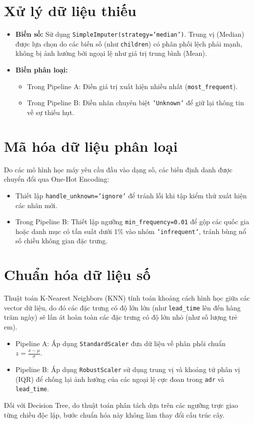 \section{Xử lý dữ liệu thiếu}
\begin{itemize}
    \item \textbf{Biến số:} Sử dụng \texttt{SimpleImputer(strategy='median')}. Trung vị (Median) được lựa chọn do các biến số (như \texttt{children}) có phân phối lệch phải mạnh, không bị ảnh hưởng bởi ngoại lệ như giá trị trung bình (Mean).
    \item \textbf{Biến phân loại:} 
    \begin{itemize}
        \item Trong Pipeline A: Điền giá trị xuất hiện nhiều nhất (\texttt{most\_frequent}).
        \item Trong Pipeline B: Điền nhãn chuyên biệt \texttt{'Unknown'} để giữ lại thông tin về sự thiếu hụt.
    \end{itemize}
\end{itemize}

\section{Mã hóa dữ liệu phân loại}
Do các mô hình học máy yêu cầu đầu vào dạng số, các biến định danh được chuyển đổi qua One-Hot Encoding:
\begin{itemize}
    \item Thiết lập \texttt{handle\_unknown='ignore'} để tránh lỗi khi tập kiểm thử xuất hiện các nhãn mới.
    \item Trong Pipeline B: Thiết lập ngưỡng \texttt{min\_frequency=0.01} để gộp các quốc gia hoặc danh mục có tần suất dưới 1\% vào nhóm \texttt{'infrequent'}, tránh bùng nổ số chiều không gian đặc trưng.
\end{itemize}

\section{Chuẩn hóa dữ liệu số}
Thuật toán K-Nearest Neighbors (KNN) tính toán khoảng cách hình học giữa các vector dữ liệu, do đó các đặc trưng có độ lớn lớn (như \texttt{lead\_time} lên đến hàng trăm ngày) sẽ lấn át hoàn toàn các đặc trưng có độ lớn nhỏ (như số lượng trẻ em).
\begin{itemize}
    \item Pipeline A: Áp dụng \texttt{StandardScaler} đưa dữ liệu về phân phối chuẩn $z = \frac{x - \mu}{\sigma}$.
    \item Pipeline B: Áp dụng \texttt{RobustScaler} sử dụng trung vị và khoảng tứ phân vị (IQR) để chống lại ảnh hưởng của các ngoại lệ cực đoan trong \texttt{adr} và \texttt{lead\_time}.
\end{itemize}
Đối với Decision Tree, do thuật toán phân tách dựa trên các ngưỡng trực giao từng chiều độc lập, bước chuẩn hóa này không làm thay đổi cấu trúc cây.


